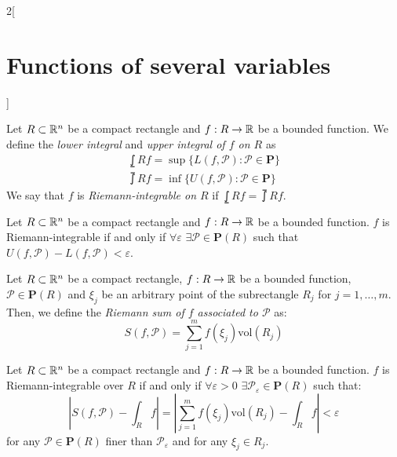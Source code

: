 \documentclass[../../../main.tex]{subfiles}
\begin{document}
\begin{multicols}{2}[\section{Functions of several variables}]
\begin{definition}
    \end{definition}
    \begin{definition}
        Let $R\subset\mathbb{R}^n$ be a compact rectangle and $f:R\rightarrow\mathbb{R} $ be a bounded function. We define the \textit{lower integral} and \textit{upper integral of $f$ on $R$} as
        \begin{gather*}
            \lowint{R}{}f=\sup\{L(f,\mathcal{P}):\mathcal{P}\in\textbf{P}\}\\
            \upint{R}{}f=\inf\{U(f,\mathcal{P}):\mathcal{P}\in\textbf{P}\}
        \end{gather*} We say that $f$ is \textit{Riemann-integrable on $R$} if $\displaystyle\lowint{R}{}f=\upint{R}{}f$.
    \end{definition}
    \begin{prop}
        Let $R\subset\mathbb{R}^n$ be a compact rectangle and $f:R\rightarrow\mathbb{R} $ be a bounded function. $f$ is Riemann-integrable if and only if $\forall\varepsilon$ $\exists\mathcal{P}\in\textbf{P}(R)$ such that $U(f,\mathcal{P})-L(f,\mathcal{P})<\varepsilon$.
    \end{prop}
    \begin{definition}
        Let $R\subset\mathbb{R}^n$ be a compact rectangle, $f:R\rightarrow\mathbb{R} $ be a bounded function, $\mathcal{P}\in\textbf{P}(R)$ and $\xi_j$ be an arbitrary point of the subrectangle $R_j$ for $j=1,\ldots,m$. Then, we define the \textit{Riemann sum of $f$ associated to $\mathcal{P}$} as: $$S(f,\mathcal{P})=\sum_{j=1}^mf(\xi_j)\text{vol}(R_j)$$
    \end{definition}
    \begin{theorem}
        Let $R\subset\mathbb{R}^n$ be a compact rectangle and $f:R\rightarrow\mathbb{R} $ be a bounded function. $f$ is Riemann-integrable over $R$ if and only if $\forall\varepsilon>0$ $\exists\mathcal{P}_\varepsilon\in\textbf{P}(R)$ such that: $$\left|S(f,\mathcal{P})-\int_Rf\right|=\left|\sum_{j=1}^mf(\xi_j)\text{vol}(R_j)-\int_Rf\right|<\varepsilon$$ for any $\mathcal{P}\in\textbf{P}(R)$ finer than $\mathcal{P}_\varepsilon$ and for any $\xi_j\in R_j$.
    \end{theorem}

\end{multicols}
\end{document}
